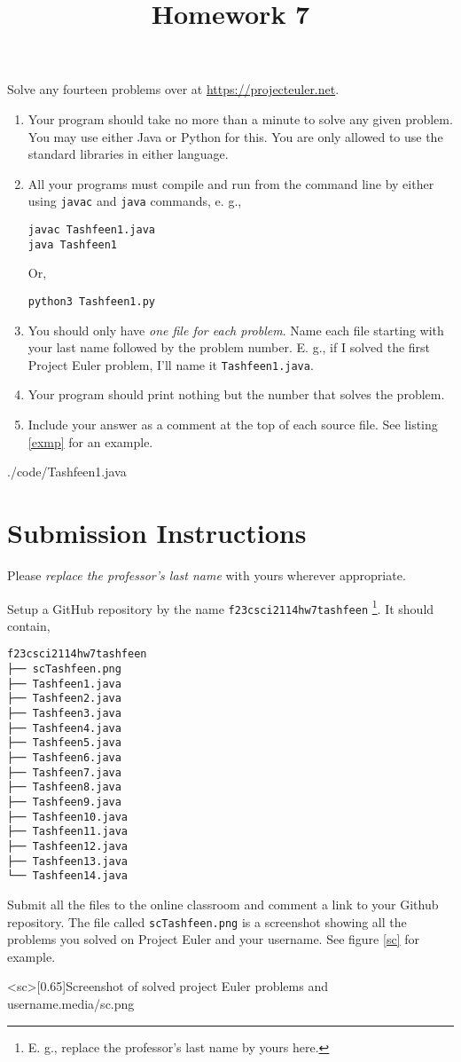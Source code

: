 \documentclass{homework}
\title{Homework 7}
\begin{document}
 \maketitle

\question Solve any fourteen problems over at
\url{https://projecteuler.net}.

\begin{enumerate}
  \item Your program should take no more than a minute to solve any given
        problem. You may use either Java or Python for this. You are only
        allowed to use the standard libraries in either language.
  \item All your programs must compile and run from the command line by
        either using \texttt{javac} and \texttt{java} commands, e. g.,
        \begin{verbatim}
javac Tashfeen1.java
java Tashfeen1
\end{verbatim}
        Or,
        \begin{verbatim}
python3 Tashfeen1.py
\end{verbatim}
  \item You should only have \textit{ one file for each problem}. Name
        each file starting with your last name followed by the problem
        number. E. g., if I solved the first Project Euler problem, I'll
        name it \texttt{Tashfeen1.java}.
  \item Your program should print nothing but the number that solves the
        problem.
  \item Include your answer as a comment at the top of each source file.
        See listing \ref{exmp} for an example.
\end{enumerate}


{./code/Tashfeen1.java}

\section{Submission Instructions}

Please \textit{replace the professor's last name} with yours
wherever appropriate.

Setup a GitHub repository by the name
\texttt{f23csci2114hw7tashfeen} \footnote{E. g., replace the
  professor's last name by yours here.}. It should contain,
\begin{verbatim}
f23csci2114hw7tashfeen
├── scTashfeen.png
├── Tashfeen1.java
├── Tashfeen2.java
├── Tashfeen3.java
├── Tashfeen4.java
├── Tashfeen5.java
├── Tashfeen6.java
├── Tashfeen7.java
├── Tashfeen8.java
├── Tashfeen9.java
├── Tashfeen10.java
├── Tashfeen11.java
├── Tashfeen12.java
├── Tashfeen13.java
└── Tashfeen14.java
\end{verbatim}

Submit all the files to the online classroom and comment a link to
your Github repository. The file called \texttt{scTashfeen.png} is a
screenshot showing all the problems you solved on Project Euler and
your username. See figure \ref{sc} for example.

\img<sc>[0.65]{Screenshot of solved project Euler problems and username.}{media/sc.png}
\end{document}
